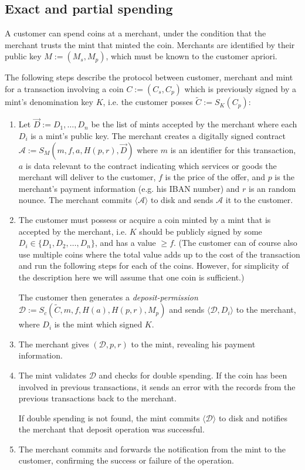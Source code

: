 \documentclass{llncs}
\begin{document}
\subsection{Exact and partial spending}

A customer can spend coins at a merchant, under the condition that the
merchant trusts the mint that minted the coin.  Merchants are
identified by their public key $M := (M_s, M_p)$, which must be known
to the customer apriori.

The following steps describe the protocol between customer, merchant and mint
for a transaction involving a coin $C := (C_s, C_p)$ which is previously signed
by a mint's denomination key $K$, i.e. the customer posses
$\widetilde{C} := S_K(C_p)$:

\begin{enumerate}
\item\label{contract} Let $\vec{D} := D_1, \ldots, D_n$ be the list of
  mints accepted by the merchant where each $D_i$ is a mint's public
  key.  The merchant creates a digitally signed contract $\mathcal{A}
  := S_M(m, f, a, H(p, r), \vec{D})$ where $m$ is an identifier for this
  transaction, $a$ is data relevant to the contract indicating which services
  or goods the merchant will deliver to the customer, $f$ is the price of the offer,
  and $p$ is the merchant's payment information (e.g. his IBAN number) and $r$ is
  an random nounce.  The merchant commits $\langle \mathcal{A}
  \rangle$ to disk and sends $\mathcal{A}$ it to the customer.
\item\label{deposit} The customer must possess or acquire a coin minted by a mint that is
  accepted by the merchant, i.e. $K$ should be publicly signed by some $D_i
  \in \{D_1, D_2, \ldots, D_n\}$, and has a value $\geq f$. (The customer
  can of course also use multiple coins where the total value adds up to
  the cost of the transaction and run the following steps for each of
  the coins. However, for simplicity of the description here we will
  assume that one coin is sufficient.)

  The customer then generates a \emph{deposit-permission} $\mathcal{D} :=
  S_c(\widetilde{C}, m, f, H(a), H(p,r), M_p)$
  and sends $\langle \mathcal{D}, D_i\rangle$ to the merchant,
  where $D_i$ is the mint which signed $K$.
\item The merchant gives $(\mathcal{D}, p, r)$ to the mint, revealing his
  payment information.

\item The mint validates $\mathcal{D}$ and checks for double spending.
  If the coin has been involved in previous transactions, it sends an error
  with the records from the previous transactions back to the merchant.

  If double spending is not found, the mint commits $\langle \mathcal{D} \rangle$ to disk
  and notifies the merchant that deposit operation was successful.

\item The merchant commits and forwards the notification from the mint to the
  customer, confirming the success or failure of the operation.
\end{enumerate}
\end{document}
